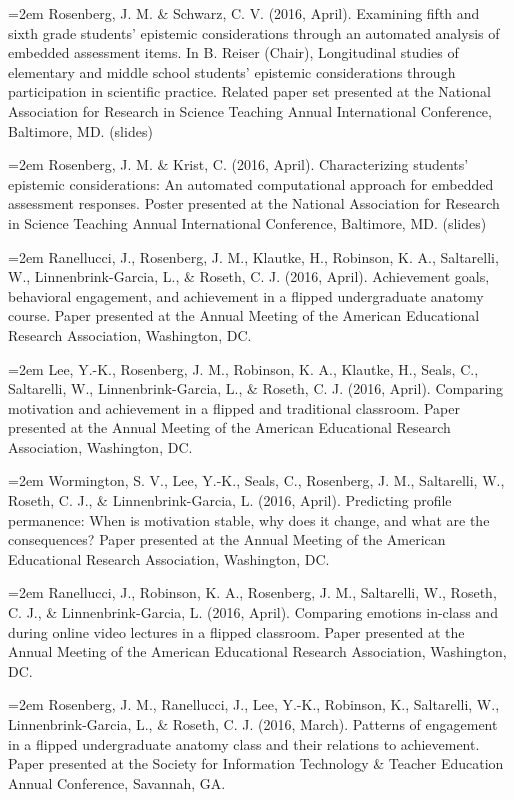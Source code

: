 \documentclass[]{article}
\begin{document}
\hangindent=2em Rosenberg, J. M. \& Schwarz, C. V. (2016, April).
Examining fifth and sixth grade students' epistemic considerations
through an automated analysis of embedded assessment items. In B. Reiser
(Chair), Longitudinal studies of elementary and middle school students'
epistemic considerations through participation in scientific practice.
Related paper set presented at the National Association for Research in
Science Teaching Annual International Conference, Baltimore, MD.
(slides)

\hangindent=2em Rosenberg, J. M. \& Krist, C. (2016, April).
Characterizing students' epistemic considerations: An automated
computational approach for embedded assessment responses. Poster
presented at the National Association for Research in Science Teaching
Annual International Conference, Baltimore, MD. (slides)

\hangindent=2em Ranellucci, J., Rosenberg, J. M., Klautke, H., Robinson,
K. A., Saltarelli, W., Linnenbrink-Garcia, L., \& Roseth, C. J. (2016,
April). Achievement goals, behavioral engagement, and achievement in a
flipped undergraduate anatomy course. Paper presented at the Annual
Meeting of the American Educational Research Association, Washington,
DC.

\hangindent=2em Lee, Y.-K., Rosenberg, J. M., Robinson, K. A., Klautke,
H., Seals, C., Saltarelli, W., Linnenbrink-Garcia, L., \& Roseth, C. J.
(2016, April). Comparing motivation and achievement in a flipped and
traditional classroom. Paper presented at the Annual Meeting of the
American Educational Research Association, Washington, DC.

\hangindent=2em Wormington, S. V., Lee, Y.-K., Seals, C., Rosenberg, J.
M., Saltarelli, W., Roseth, C. J., \& Linnenbrink-Garcia, L. (2016,
April). Predicting profile permanence: When is motivation stable, why
does it change, and what are the consequences? Paper presented at the
Annual Meeting of the American Educational Research Association,
Washington, DC.

\hangindent=2em Ranellucci, J., Robinson, K. A., Rosenberg, J. M.,
Saltarelli, W., Roseth, C. J., \& Linnenbrink-Garcia, L. (2016, April).
Comparing emotions in-class and during online video lectures in a
flipped classroom. Paper presented at the Annual Meeting of the American
Educational Research Association, Washington, DC.

\hangindent=2em Rosenberg, J. M., Ranellucci, J., Lee, Y.-K., Robinson,
K., Saltarelli, W., Linnenbrink-Garcia, L., \& Roseth, C. J. (2016,
March). Patterns of engagement in a flipped undergraduate anatomy class
and their relations to achievement. Paper presented at the Society for
Information Technology \& Teacher Education Annual Conference, Savannah,
GA.
\end{document}
